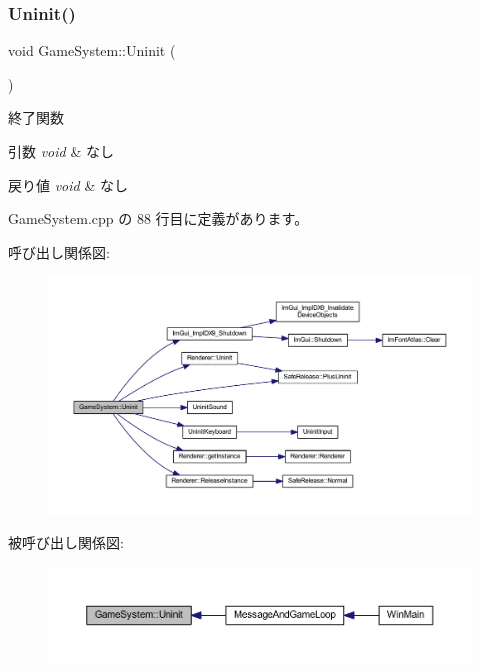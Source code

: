 \subsubsection{\texorpdfstring{Uninit()}{Uninit()}}
{\footnotesize\ttfamily void Game\+System\+::\+Uninit (\begin{DoxyParamCaption}{ }\end{DoxyParamCaption})}



終了関数 


\begin{DoxyParams}{引数}
{\em void} & なし \\
\hline
\end{DoxyParams}

\begin{DoxyRetVals}{戻り値}
{\em void} & なし \\
\hline
\end{DoxyRetVals}


 Game\+System.\+cpp の 88 行目に定義があります。

呼び出し関係図\+:
\nopagebreak
\begin{figure}[H]
\begin{center}
\leavevmode
\includegraphics[width=350pt]{class_game_system_af76866bd03b84dca6880f1493fd3c9d1_cgraph}
\end{center}
\end{figure}
被呼び出し関係図\+:
\nopagebreak
\begin{figure}[H]
\begin{center}
\leavevmode
\includegraphics[width=350pt]{class_game_system_af76866bd03b84dca6880f1493fd3c9d1_icgraph}
\end{center}
\end{figure}
\mbox{\label{class_game_system_ab0add1f2bd97d3b125a5682f571053a3}} 
